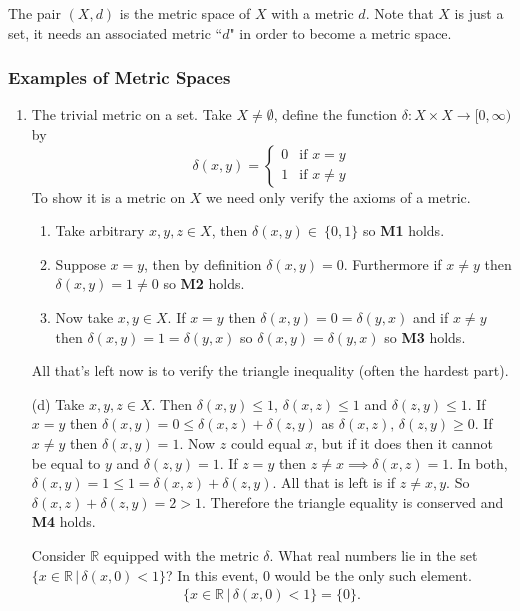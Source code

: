 \documentclass[10pt]{article}
\begin{document}
The pair $(X,d)$ is the metric space of $X$ with a metric $d$. Note that $X$ is just a set, it needs an associated metric ``$d$" in order to become a metric space.

\subsubsection{Examples of Metric Spaces}
\begin{enumerate}
    \item The trivial metric on a set. Take $X\neq\emptyset$, define the function $\delta:X\times X\to[0,\infty)$ by
    \begin{equation*}
        \delta(x,y)=
        \begin{cases}
            0 & \text{if $x=y$}\\
            1 & \text{if $x\neq y$}
        \end{cases}
    \end{equation*}
    To show it is a metric on $X$ we need only verify the axioms of a metric.
    \begin{enumerate}
        \item Take arbitrary $x,y,z\in X$, then $\delta(x,y)\in~\{0,1\}$ so \textbf{M1} holds. 
        \item Suppose $x=y$, then by definition $\delta(x,y)=0$. Furthermore if $x\neq y$ then $\delta(x,y)=1\neq0$ so \textbf{M2} holds. 
        \item Now take $x,y\in X$. If $x=y$ then $\delta(x,y)=0=\delta(y,x)$ and if $x\neq y$ then $\delta(x,y)=1=\delta(y,x)$ so $\delta(x,y)=\delta(y,x)$ so \textbf{M3} holds.
    \end{enumerate}
    All that's left now is to verify the triangle inequality (often the hardest part).

    (d) Take $x,y,z\in X$. Then $\delta(x,y)\leq1$, $\delta(x,z)\leq1$ and $\delta(z,y)\leq1$. If $x=y$ then $\delta(x,y)=0\leq \delta(x,z)+\delta(z,y)$ as $\delta(x,z),\,\delta(z,y)\geq0$. If $x\neq y$ then $\delta(x,y)=1$. Now $z$ could equal $x$, but if it does then it cannot be equal to $y$ and $\delta(z,y)=1$. If $z=y$ then $z\neq x\implies\delta(x,z)=1$. In both, $\delta(x,y)=1\leq1=\delta(x,z)+\delta(z,y)$. All that is left is if $z\neq x,y$. So $\delta(x,z)+\delta(z,y)=2>1$. Therefore the triangle equality is conserved and \textbf{M4} holds.

    Consider $\mathbb{R}$ equipped with the metric $\delta$. What real numbers lie in the set $\{x\in\mathbb{R}\,|\,\delta(x,0)<1\}$? In this event, 0 would be the only such element.
    \begin{align*}
        \{x\in\mathbb{R}\,|\,\delta(x,0)<1\}=\{0\}.
    \end{align*}


\end{enumerate}
\end{document}
